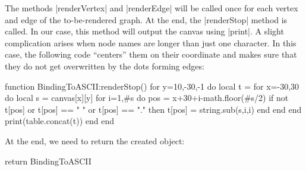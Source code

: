 The methods |renderVertex| and |renderEdge| will be called once for each vertex
and edge of the to-be-rendered graph. At the end, the |renderStop| method is
called. In our case, this method will output the canvas using |print|. A slight
complication arises when node names are longer than just one character. In this
case, the following code ``centers'' them on their coordinate and makes sure
that they do not get overwritten by the dots forming edges:
%
\begin{codeexample}
function BindingToASCII:renderStop()
  for y=10,-30,-1 do
    local t = {}
    for x=-30,30 do
      local s = canvas[x][y]
      for i=1,#s do
        pos = x+30+i-math.floor(#s/2)
        if not t[pos] or t[pos] == " " or t[pos] == "." then
          t[pos] = string.sub(s,i,i)
        end
      end
    end
    print(table.concat(t))
  end
end
\end{codeexample}

At the end, we need to return the created object:
%
\begin{codeexample}
return BindingToASCII
\end{codeexample}

